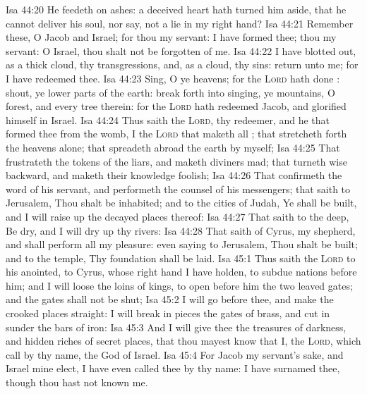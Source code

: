 \vs Isa 44:20 He feedeth on ashes: a deceived heart hath turned him aside, that he cannot deliver his soul, nor say,  not a lie in my right hand?
\vs Isa 44:21 Remember these, O Jacob and Israel; for thou  my servant: I have formed thee; thou  my servant: O Israel, thou shalt not be forgotten of me.
\vs Isa 44:22 I have blotted out, as a thick cloud, thy transgressions, and, as a cloud, thy sins: return unto me; for I have redeemed thee.
\vs Isa 44:23 Sing, O ye heavens; for the \textsc{Lord} hath done : shout, ye lower parts of the earth: break forth into singing, ye mountains, O forest, and every tree therein: for the \textsc{Lord} hath redeemed Jacob, and glorified himself in Israel.
\vs Isa 44:24 Thus saith the \textsc{Lord}, thy redeemer, and he that formed thee from the womb, I  the \textsc{Lord} that maketh all ; that stretcheth forth the heavens alone; that spreadeth abroad the earth by myself;
\vs Isa 44:25 That frustrateth the tokens of the liars, and maketh diviners mad; that turneth wise  backward, and maketh their knowledge foolish;
\vs Isa 44:26 That confirmeth the word of his servant, and performeth the counsel of his messengers; that saith to Jerusalem, Thou shalt be inhabited; and to the cities of Judah, Ye shall be built, and I will raise up the decayed places thereof:
\vs Isa 44:27 That saith to the deep, Be dry, and I will dry up thy rivers:
\vs Isa 44:28 That saith of Cyrus,  my shepherd, and shall perform all my pleasure: even saying to Jerusalem, Thou shalt be built; and to the temple, Thy foundation shall be laid.
\vs Isa 45:1 Thus saith the \textsc{Lord} to his anointed, to Cyrus, whose right hand I have holden, to subdue nations before him; and I will loose the loins of kings, to open before him the two leaved gates; and the gates shall not be shut;
\vs Isa 45:2 I will go before thee, and make the crooked places straight: I will break in pieces the gates of brass, and cut in sunder the bars of iron:
\vs Isa 45:3 And I will give thee the treasures of darkness, and hidden riches of secret places, that thou mayest know that I, the \textsc{Lord}, which call  by thy name,  the God of Israel.
\vs Isa 45:4 For Jacob my servant's sake, and Israel mine elect, I have even called thee by thy name: I have surnamed thee, though thou hast not known me.
